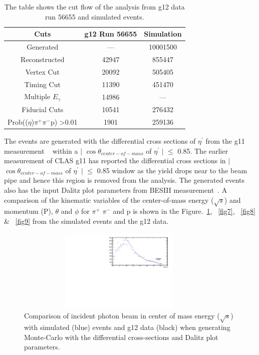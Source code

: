 \documentclass[12pt,a4paper]{amsbook}
\theoremstyle{definition}
\begin{document}
\begin{table}[]
\centering
\begin{tabular}{|c|c|c|}
\hline
Cuts                                        & g12 Run 56655                    & Simulation \\
\hline
Generated                               & ---                          & 10001500   \\
Reconstructed                           & 42947                        & 855447     \\
Vertex Cut                              & 20092                        & 505405     \\
Timing Cut                              & 11390                        & 451470     \\
Multiple $E_{\gamma}$ & 14986 & ---            \\
Fiducial Cuts                           & 10541                        & 276432     \\
Prob(($\eta$)$\pi^{+}$$\pi^{-}$p) \textgreater 0.01                & 1901                         & 259136    \\
\hline
\end{tabular}
\caption{The table shows the cut flow of the analysis from g12 data run 56655 and simulated events.}
\label{tab3}
\end{table}
 
 
The events are generated with the differential cross sections of $\eta^{\prime}$ from the g11 measurement ~\cite{Williams:2009yj} within a $\mid$ $\cos\theta_{center-of-mass}$ of $\eta^{\prime}$ $\mid$ $\leq$ 0.85. The earlier measurement of CLAS g11 has reported the differential cross sections in $\mid$ $\cos\theta_{center-of-mass}$ of $\eta^{\prime}$ $\mid$ $\leq$ 0.85 window as the yield drops near to the beam pipe and hence this region is removed from the analysis. The generated events also has the input Dalitz plot parameters from BESIII measurement~\cite{Ablikim:2010kp}. A comparison of the kinematic variables of the center-of-mass energy ($\sqrt{s}$) and momentum (P), $\theta$ and $\phi$ for $\pi^{+}$ $\pi^{-}$ and p is shown in the Figure.~\ref{fig6}, ~\ref{fig7}, ~\ref{fig8} $\&$ ~\ref{fig9} from the simulated events and the g12 data.

\begin{figure}[ht!]
\centerline{
\includegraphics[width=10cm,height=4cm]{w.pdf}}
\caption{Comparison of incident photon beam in center of mass energy ($\sqrt{s}$) with simulated (blue) events and g12 data (black) when generating Monte-Carlo with the differential cross-sections and Dalitz plot parameters.}
\label{fig6}
\end{figure}
\end{document}
